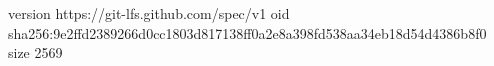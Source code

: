 version https://git-lfs.github.com/spec/v1
oid sha256:9e2ffd2389266d0cc1803d817138ff0a2e8a398fd538aa34eb18d54d4386b8f0
size 2569
